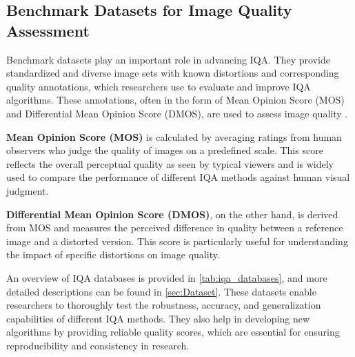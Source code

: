 \subsection{Benchmark Datasets for Image Quality Assessment}
\label{sub:BenchmarkDatasetsIQA}
Benchmark datasets play an important role in advancing IQA. They provide standardized and diverse image sets with known distortions and corresponding quality annotations, which researchers use to evaluate and improve IQA algorithms. These annotations, often in the form of Mean Opinion Score (MOS) and Differential Mean Opinion Score (DMOS),  are used to assess image quality \autocite{D}. \par
\vspace{\baselineskip}
\noindent
\textbf{Mean Opinion Score (MOS)} is calculated by averaging ratings from human observers who judge the quality of images on a predefined scale. This score reflects the overall perceptual quality as seen by typical viewers and is widely used to compare the performance of different IQA methods against human visual judgment. \par
\vspace{\baselineskip}
\noindent
\textbf{Differential Mean Opinion Score (DMOS)}, on the other hand, is derived from MOS and measures the perceived difference in quality between a reference image and a distorted version. This score is particularly useful for understanding the impact of specific distortions on image quality. \par
\vspace{\baselineskip}
\noindent
An overview of IQA databases is provided in \autoref{tab:iqa_databases}, and more detailed descriptions can be found in \autoref{sec:Dataset}. These datasets enable researchers to thoroughly test the robustness, accuracy, and generalization capabilities of different IQA methods. They also help in developing new algorithms by providing reliable quality scores, which are essential for ensuring reproducibility and consistency in research. \par

